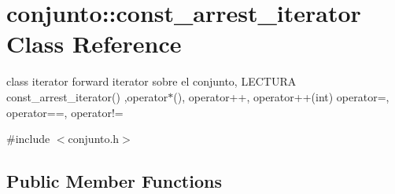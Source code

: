 \hypertarget{classconjunto_1_1const__arrest__iterator}{}\section{conjunto\+:\+:const\+\_\+arrest\+\_\+iterator Class Reference}
\label{classconjunto_1_1const__arrest__iterator}


class iterator forward iterator sobre el conjunto, L\+E\+C\+T\+U\+R\+A const\+\_\+arrest\+\_\+iterator() ,operator$\ast$(), operator++, operator++(int) operator=, operator==, operator!=  




{\ttfamily \#include $<$conjunto.\+h$>$}

\subsection*{Public Member Functions}
